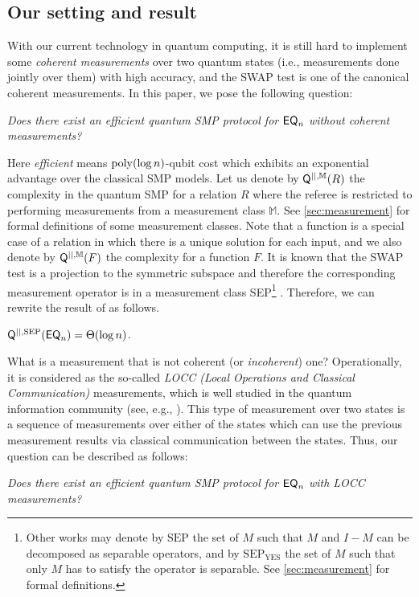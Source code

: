 \subsection{Our setting and result}

With our current technology in quantum computing, it is still hard to implement some {\em coherent measurements} over two quantum states 
(i.e., measurements done jointly over them) with high accuracy, and the SWAP test is one of the canonical coherent measurements. In this paper, we pose the following question: 
\newline
\newline
\centerline{\emph{Does there exist an efficient quantum SMP protocol for $\mathsf{EQ}_n$ without coherent measurements?}}
\newline

Here \emph{efficient} means $\mathrm{poly} (\log n)$-qubit cost which exhibits an exponential advantage over the classical SMP models. Let us denote by $\mathsf{Q}^{||,\mathbb{M}}(R)$ the complexity in the quantum SMP for a relation $R$ where the referee is restricted to performing measurements from a measurement class $\mathbb{M}$. See \cref{sec:measurement} for formal definitions of some measurement classes. Note that a function is a special case of a relation in which there is a unique solution for each input, and we also denote by $\mathsf{Q}^{||,\mathbb{M}}(F)$ the complexity for a function $F$. It is known that the SWAP test is a projection to the symmetric subspace and therefore the corresponding measurement operator is in a measurement class SEP\footnote{Other works may denote by $\mathrm{SEP}$ the set of $M$ such that $M$ and $I-M$ can be decomposed as separable operators, and by $\mathrm{SEP}_\mathrm{YES}$ the set of $M$ such that only $M$ has to satisfy the operator is separable. See \cref{sec:measurement} for formal definitions.} \cite{HM13}. Therefore, we can rewrite the result of \cite{BCWdW01} as follows.

\begin{theorem}
    $\mathsf{Q}^{||,\mathrm{SEP}}(\mathsf{EQ}_n) = \Theta(\log n)$. 
\end{theorem}

What is a measurement that is not coherent (or {\em incoherent}) one? Operationally, it is considered as the so-called {\em LOCC (Local Operations and Classical Communication)} measurements, which is well studied in the quantum information community (see, e.g., \cite{CLM+14}). This type of measurement over two states is a sequence of measurements over either of the states 
which can use the previous measurement results via classical communication between the states. 
Thus, our question can be described as follows:
\newline
\newline
\centerline{\emph{Does there exist an efficient quantum SMP protocol for $\mathsf{EQ}_n$ with LOCC measurements?}}
\newline

